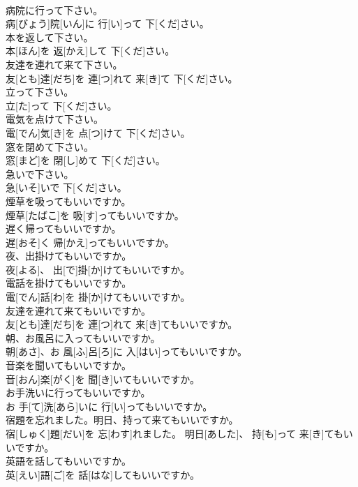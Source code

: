 \documentclass[8pt]{extreport}
\begin{document}
\begin{CJK}{UTF8}{min}
\\	病院に行って下さい。	
\\	病[びょう]院[いん]に 行[い]って 下[くだ]さい。
\\	本を返して下さい。	
\\	本[ほん]を 返[かえ]して 下[くだ]さい。
\\	友達を連れて来て下さい。	
\\	友[とも]達[だち]を 連[つ]れて 来[き]て 下[くだ]さい。
\\	立って下さい。	
\\	立[た]って 下[くだ]さい。
\\	電気を点けて下さい。	
\\	電[でん]気[き]を 点[つ]けて 下[くだ]さい。
\\	窓を閉めて下さい。	
\\	窓[まど]を 閉[し]めて 下[くだ]さい。
\\	急いで下さい。	
\\	急[いそ]いで 下[くだ]さい。
\\	煙草を吸ってもいいですか。	
\\	煙草[たばこ]を 吸[す]ってもいいですか。
\\	遅く帰ってもいいですか。	
\\	遅[おそ]く 帰[かえ]ってもいいですか。
\\	夜、出掛けてもいいですか。	
\\	夜[よる]、 出[で]掛[か]けてもいいですか。
\\	電話を掛けてもいいですか。	
\\	電[でん]話[わ]を 掛[か]けてもいいですか。
\\	友達を連れて来てもいいですか。	
\\	友[とも]達[だち]を 連[つ]れて 来[き]てもいいですか。
\\	朝、お風呂に入ってもいいですか。	
\\	朝[あさ]、お 風[ふ]呂[ろ]に 入[はい]ってもいいですか。
\\	音楽を聞いてもいいですか。	
\\	音[おん]楽[がく]を 聞[き]いてもいいですか。
\\	お手洗いに行ってもいいですか。	
\\	お 手[て]洗[あら]いに 行[い]ってもいいですか。
\\	宿題を忘れました。明日、持って来てもいいですか。	
\\	宿[しゅく]題[だい]を 忘[わす]れました。 明日[あした]、 持[も]って 来[き]てもいいですか。
\\	英語を話してもいいですか。	
\\	英[えい]語[ご]を 話[はな]してもいいですか。

\end{CJK}
\end{document}
